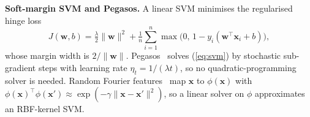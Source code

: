 \documentclass[10pt,twocolumn,a4paper]{article}
\begin{document}
\textbf{Soft-margin SVM and Pegasos.} A linear SVM minimises the
regularised hinge loss
\begin{equation}
  J(\mathbf{w},b)=\tfrac{\lambda}{2}\lVert\mathbf{w}\rVert^{2}
  +\tfrac{1}{n}\sum_{i=1}^{n}\max\!\big(0,\,1-y_i(\mathbf{w}^{\top}\mathbf{x}_i+b)\big),
  \label{eq:svm}
\end{equation}
whose margin width is $2/\lVert\mathbf{w}\rVert$. Pegasos~\cite{pegasos}
solves (\ref{eq:svm}) by stochastic sub-gradient steps with learning rate
$\eta_t = 1/(\lambda t)$, so no quadratic-programming solver is needed.
Random Fourier features~\cite{rff} map $\mathbf{x}$ to
$\phi(\mathbf{x})$ with $\phi(\mathbf{x})^\top\phi(\mathbf{x}')\approx
\exp(-\gamma\lVert\mathbf{x}-\mathbf{x}'\rVert^2)$, so a linear solver on
$\phi$ approximates an RBF-kernel SVM.

\end{document}
